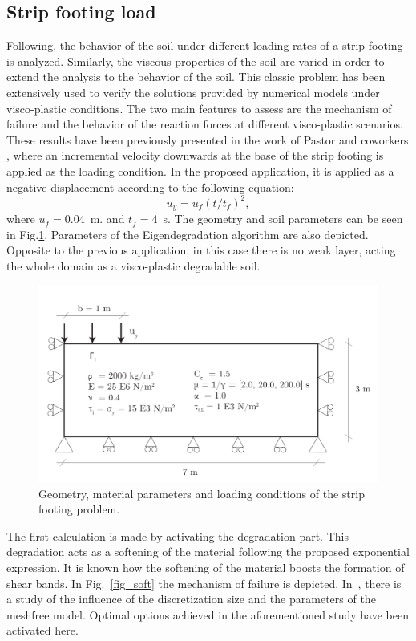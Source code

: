 \documentclass[applsci,journal,article,submit,moreauthors,pdftex]{Definitions/mdpi}
\begin{document}
\subsection{Strip footing load}
\label{S42}
Following, the behavior of the soil under different loading rates of a strip footing is analyzed. Similarly, the viscous properties of the soil are varied in order to extend the analysis to the behavior of the soil. This classic problem has been extensively used to verify the solutions provided by numerical models under visco-plastic conditions. The two main features to assess are the mechanism of failure and the behavior of the reaction forces at different visco-plastic scenarios. These results have been previously presented in the work of Pastor and coworkers \cite{BlancPastor2012,Navas2018}, where an incremental velocity downwards at the base of the strip footing is applied as the loading condition. In the proposed application, it is applied as a negative displacement according to the following equation: $$u_y=u_f\left(t/t_f\right)^2,$$ 
where $u_f=0.04$~m. and $t_f=4$~s. The geometry and soil parameters can be seen in Fig.\ref{fig_geozap}. Parameters of the Eigendegradation algorithm are also depicted. Opposite to the previous application, in this case there is no weak layer, acting the whole domain as a visco-plastic degradable soil.

\begin{figure}[!t]
\begin{center}
\includegraphics[width=12cm]{Figs/geo_zap.pdf}
\caption{Geometry, material parameters and loading conditions of the strip footing problem.}
\label{fig_geozap}
\end{center}
\end{figure}

The first calculation is made by activating the degradation part. This degradation acts as a softening of the material following the proposed exponential expression. It is known how the softening of the material boosts the formation of shear bands. In Fig.~\ref{fig_soft} the mechanism of failure is depicted. In~\cite{Navas2018}, there is a study of the influence of the discretization size and the parameters of the meshfree model. Optimal options achieved in the aforementioned study have been activated here.
\end{document}
